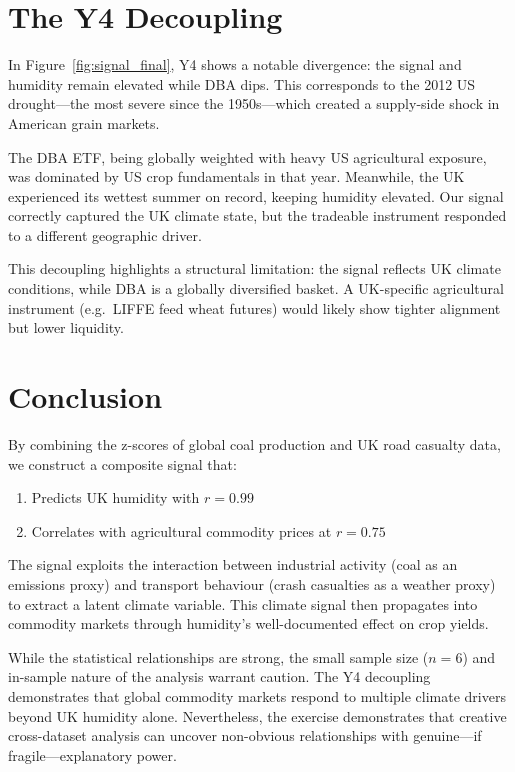 \documentclass[12pt,a4paper]{article}
\begin{document}
\section{The Y4 Decoupling}
\label{sec:y4}

In Figure~\ref{fig:signal_final}, Y4 shows a notable divergence: the signal and humidity remain elevated while DBA dips. This corresponds to the 2012 US drought---the most severe since the 1950s---which created a supply-side shock in American grain markets.

The DBA ETF, being globally weighted with heavy US agricultural exposure, was dominated by US crop fundamentals in that year. Meanwhile, the UK experienced its wettest summer on record, keeping humidity elevated. Our signal correctly captured the UK climate state, but the tradeable instrument responded to a different geographic driver.

This decoupling highlights a structural limitation: the signal reflects UK climate conditions, while DBA is a globally diversified basket. A UK-specific agricultural instrument (e.g.\ LIFFE feed wheat futures) would likely show tighter alignment but lower liquidity.


\section{Conclusion}

By combining the z-scores of global coal production and UK road casualty data, we construct a composite signal that:

\begin{enumerate}[nosep]
    \item Predicts UK humidity with $r = 0.99$
    \item Correlates with agricultural commodity prices at $r = 0.75$
\end{enumerate}

The signal exploits the interaction between industrial activity (coal as an emissions proxy) and transport behaviour (crash casualties as a weather proxy) to extract a latent climate variable. This climate signal then propagates into commodity markets through humidity's well-documented effect on crop yields.

While the statistical relationships are strong, the small sample size ($n = 6$) and in-sample nature of the analysis warrant caution. The Y4 decoupling demonstrates that global commodity markets respond to multiple climate drivers beyond UK humidity alone. Nevertheless, the exercise demonstrates that creative cross-dataset analysis can uncover non-obvious relationships with genuine---if fragile---explanatory power.
\end{document}
